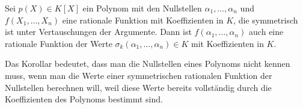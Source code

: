 \begin{korollar}
Sei $p(X)\in K[X]$ ein Polynom mit den Nullstellen
$\alpha_1,\dots,\alpha_n$ und
$f(X_1,\dots,X_n)$ eine rationale Funktion mit Koeffizienten
in $K$, die symmetrisch ist unter Vertauschungen der Argumente.
Dann ist $f(\alpha_1,\dots,\alpha_n)$ auch eine rationale Funktion
der Werte $\sigma_k(\alpha_1,\dots,\alpha_n)\in K$ mit Koeffizienten in $K$.
\end{korollar}

Das Korollar bedeutet, dass man die Nullstellen eines Polynoms 
nicht kennen muss, wenn man die Werte einer symmetrischen rationalen
Funktion der Nullstellen berechnen will, weil diese Werte bereits vollständig
durch die Koeffizienten des Polynoms bestimmt sind.

